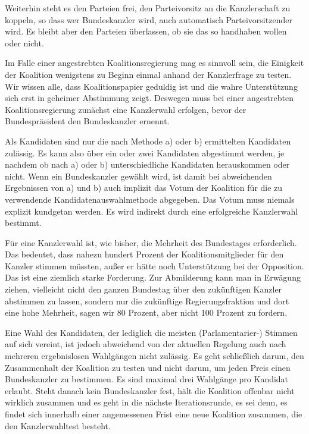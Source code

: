 Weiterhin steht es den Parteien frei, den Parteivorsitz an die Kanzlerschaft zu koppeln, so dass wer Bundeskanzler wird,
auch automatisch Parteivorsitzender wird.
Es bleibt aber den Parteien überlassen, ob sie das so handhaben wollen oder nicht.

Im Falle einer angestrebten Koalitionsregierung mag es sinnvoll sein, die Einigkeit der Koalition wenigstens zu Beginn
einmal anhand der Kanzlerfrage zu testen.
Wir wissen alle, dass Koalitionspapier geduldig ist und die wahre Unterstützung sich erst in geheimer Abstimmung zeigt.
Deswegen muss bei einer angestrebten Koalitionsregierung zunächst eine Kanzlerwahl erfolgen, bevor der Bundespräsident
den Bundeskanzler ernennt.

Als Kandidaten sind nur die nach Methode a) oder b) ermittelten Kandidaten zulässig.
Es kann also über ein oder zwei
Kandidaten abgestimmt werden, je nachdem ob nach a) oder b) unterschiedliche Kandidaten herauskommen oder nicht.
Wenn ein Bundeskanzler gewählt wird, ist damit bei abweichenden Ergebnissen von a) und b) auch implizit das Votum der
Koalition für die zu verwendende Kandidatenauswahlmethode abgegeben.
Das Votum muss niemals explizit kundgetan werden.
Es wird indirekt durch eine erfolgreiche Kanzlerwahl bestimmt.

Für eine Kanzlerwahl ist, wie bisher, die Mehrheit des Bundestages
erforderlich.
Das bedeutet, dass nahezu hundert Prozent der Koalitionsmitglieder für den Kanzler stimmen müssten, außer er
hätte noch Unterstützung bei der Opposition.
Das ist eine ziemlich starke Forderung.
Zur Abmilderung kann man in Erwägung ziehen, vielleicht nicht den ganzen Bundestag
über den zukünftigen Kanzler abstimmen zu lassen, sondern nur die zukünftige Regierungsfraktion und dort eine hohe
Mehrheit, sagen wir 80 Prozent, aber nicht 100 Prozent zu fordern.

Eine Wahl des Kandidaten, der lediglich die meisten (Parlamentarier-) Stimmen auf sich vereint, ist jedoch abweichend von der aktuellen Regelung auch nach
mehreren ergebnislosen Wahlgängen nicht zulässig.
Es geht schließlich darum, den Zusammenhalt der Koalition zu testen und nicht darum, um jeden Preis einen Bundeskanzler zu bestimmen.
Es sind maximal drei Wahlgänge pro Kandidat erlaubt.
Steht danach kein Bundeskanzler fest, hält die Koalition offenbar nicht wirklich zusammen und es geht in die nächste Iterationsrunde, es
sei denn, es findet sich innerhalb einer angemessenen Frist eine neue Koalition zusammen, die den Kanzlerwahltest besteht.

